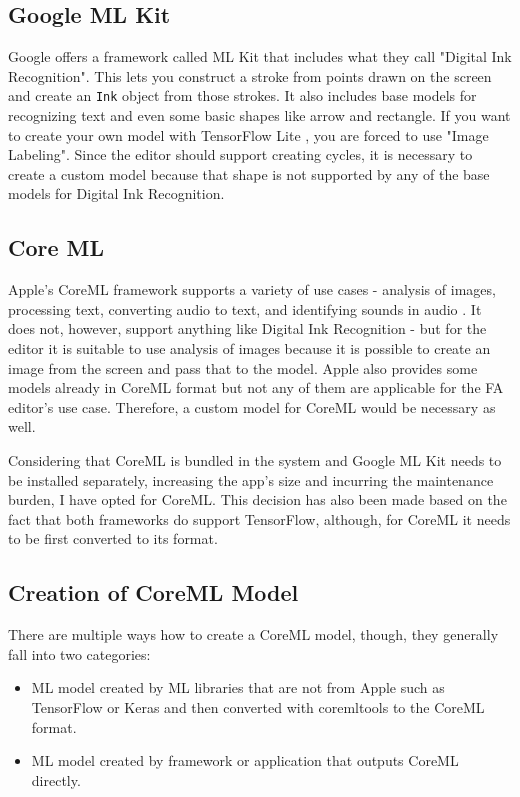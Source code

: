 \subsection{Google ML Kit}

Google offers a framework called ML Kit that includes what they call "Digital Ink Recognition". This lets you construct a stroke from points drawn on the screen and create an \lstinline{Ink} object from those strokes. It also includes base models for recognizing text and even some basic shapes like arrow and rectangle. If you want to create your own model with TensorFlow Lite \cite{tensorflow}, you are forced to use "Image Labeling". Since the editor should support creating cycles, it is necessary to create a custom model because that shape is not supported by any of the base models for Digital Ink Recognition.

\subsection{Core ML}

Apple's CoreML framework supports a variety of use cases - analysis of images, processing text, converting audio to text, and identifying sounds in audio \cite{coreml}. It does not, however, support anything like Digital Ink Recognition - but for the editor it is suitable to use analysis of images because it is possible to create an image from the screen and pass that to the model. Apple also provides some models already in CoreML format \cite{coreml-models} but not any of them are applicable for the FA editor's use case. Therefore, a custom model for CoreML would be necessary as well.

Considering that CoreML is bundled in the system and Google ML Kit needs to be installed separately, increasing the app's size and incurring the maintenance burden, I have opted for CoreML. This decision has also been made based on the fact that both frameworks do support TensorFlow, although, for CoreML it needs to be first converted to its format.

\subsection{Creation of CoreML Model}

There are multiple ways how to create a CoreML model, though, they generally fall into two categories:
\begin{itemize}
    \item ML model created by ML libraries that are not from Apple such as TensorFlow or Keras \cite{keras} and then converted with coremltools \cite{coremltools} to the CoreML format.
    \item ML model created by framework or application that outputs CoreML directly.
\end{itemize}

